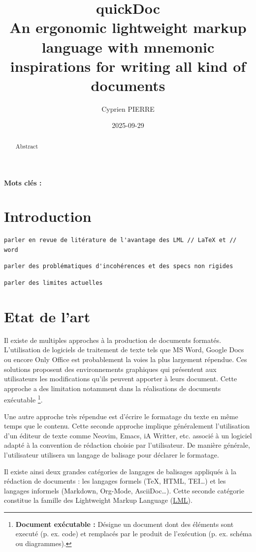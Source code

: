 \documentclass[a4paper,12pt]{article}
\author{Cyprien PIERRE \orcidlink{0009-0009-9040-6795}}
\date{2025-09-29}
\title{quickDoc\\\medskip
\large An ergonomic lightweight markup language with mnemonic inspirations for writing all kind of documents}
\begin{document}
\maketitle
\begin{abstract}
Abstract
\end{abstract}

\textbf{Mots clés : }
\section{Introduction}
\label{sec:org8eeffe3}

\begin{verbatim}
parler en revue de litérature de l'avantage des LML // LaTeX et // word
\end{verbatim}

\begin{verbatim}
parler des problématiques d'incohérences et des specs non rigides
\end{verbatim}

\begin{verbatim}
parler des limites actuelles
\end{verbatim}
\section{Etat de l'art}
\label{sec:org3f75bc9}
Il existe de multiples approches à la production de documents formatés. L'utilisation de logiciels de traitement de texte tels que MS Word, Google Docs ou encore Only Office est probablement la voies la plus largement répendue. Ces solutions proposent des environnements graphiques qui présentent aux utilisateurs les modifications qu'ils peuvent apporter à leurs document. Cette approche a des limitation notamment dans la réalisations de documents exécutable \footnote{\textbf{Document exécutable :} Désigne un document dont des éléments sont executé (p. ex. code) et remplacés par le produit de l'exécution (p. ex. schéma ou diagrammes).}.

Une autre approche très répendue est d'écrire le formatage du texte en même temps que le contenu. Cette seconde approche implique généralement l'utilisation d'un éditeur de texte comme Neovim, Emacs, iA Writter, etc. associé à un logiciel adapté à la convention de rédaction choisie par l'utilisateur. De manière générale, l'utilisateur utilisera un langage de balisage pour déclarer le formatage.

Il existe ainsi deux grandes catégories de langages de balisages appliqués à la rédaction de documents : les langages formels (\TeX{}, HTML, TEI\ldots{}) et les langages informels (Markdown, Org-Mode, AsciiDoc\ldots{})\autocite{leonardGuidanceMarkdownDesign2016}. Cette seconde catégorie constitue la famille des Lightweight Markup Language
 (\protect\hyperlink{gls-1}{\label{gls-1-use-1}LML}).
\end{document}
